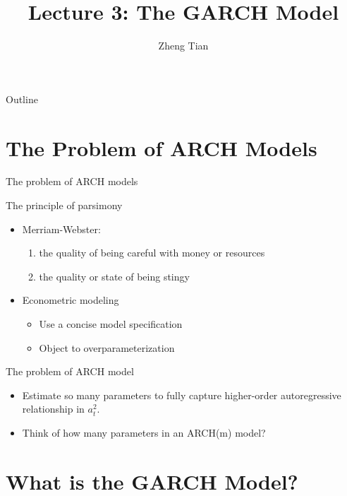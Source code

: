 \documentclass[presentation,10pt]{beamer}
\author{Zheng Tian}
\date{}
\title{Lecture 3: The GARCH Model}
\begin{document}
\maketitle
\begin{frame}{Outline}
\tableofcontents
\end{frame}



\section{The Problem of ARCH Models}
\label{sec:org432edfa}

\begin{frame}[label={sec:orgf3a2198}]{The problem of ARCH models}
\begin{block}{The principle of parsimony}
\begin{itemize}
\item Merriam-Webster:
\begin{enumerate}
\item the quality of being careful with money or resources
\item the quality or state of being stingy
\end{enumerate}

\item Econometric modeling
\begin{itemize}
\item Use a concise model specification
\item Object to overparameterization
\end{itemize}
\end{itemize}
\end{block}

\begin{block}{The problem of ARCH model}
\begin{itemize}
\item Estimate so many parameters to fully capture higher-order
autoregressive relationship in \(a^2_t\).

\item Think of how many parameters in an ARCH(m) model?
\end{itemize}
\end{block}
\end{frame}


\section{What is the GARCH Model?}
\label{sec:org357ca55}
\end{document}
